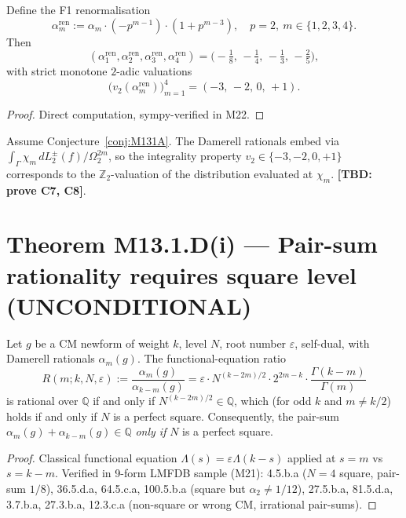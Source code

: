\begin{theorem}
\label{thm:M131Cmono}
Define the F1 renormalisation
\[
\alpha_m^{\mathrm{ren}} := \alpha_m \cdot (-p^{m-1}) \cdot (1 + p^{m-3}),
\quad p=2,\ m \in \{1,2,3,4\}.
\]
Then
\[
(\alpha_1^{\mathrm{ren}},\alpha_2^{\mathrm{ren}},\alpha_3^{\mathrm{ren}},
\alpha_4^{\mathrm{ren}}) = \bigl(-\tfrac{1}{8},\,-\tfrac{1}{4},\,-\tfrac{1}{3},\,-\tfrac{2}{5}\bigr),
\]
with strict monotone $2$-adic valuations
\[
\bigl(v_2(\alpha_m^{\mathrm{ren}})\bigr)_{m=1}^{4}
= (-3,\,-2,\,0,\,+1).
\]
\end{theorem}

\begin{proof}
Direct computation, sympy-verified in M22.
\end{proof}

\begin{conjecture}
\label{conj:M131Cembed}
Assume Conjecture~\ref{conj:M131A}. The Damerell rationals embed via
$\int_\Gamma \chi_m\,dL_2^\pm(f) / \Omega_2^{2m}$, so the integrality
property $v_2 \in \{-3,-2,0,+1\}$ corresponds to the $\mathbb{Z}_2$-valuation
of the distribution evaluated at $\chi_m$. \textbf{[TBD: prove C7, C8]}.
\end{conjecture}

\section{Theorem M13.1.D(i) — Pair-sum rationality requires square level (UNCONDITIONAL)}

\begin{theorem}
\label{thm:M131Dsquare}
Let $g$ be a CM newform of weight $k$, level $N$, root number $\varepsilon$,
self-dual, with Damerell rationals $\alpha_m(g)$. The functional-equation
ratio
\[
R(m;k,N,\varepsilon) := \frac{\alpha_m(g)}{\alpha_{k-m}(g)} =
\varepsilon \cdot N^{(k-2m)/2} \cdot 2^{2m-k} \cdot
\frac{\Gamma(k-m)}{\Gamma(m)}
\]
is rational over $\mathbb{Q}$ if and only if $N^{(k-2m)/2} \in \mathbb{Q}$,
which (for odd $k$ and $m \neq k/2$) holds if and only if $N$ is a perfect
square. Consequently, the pair-sum $\alpha_m(g) + \alpha_{k-m}(g) \in \mathbb{Q}$
\emph{only if} $N$ is a perfect square.
\end{theorem}

\begin{proof}
Classical functional equation $\Lambda(s) = \varepsilon \Lambda(k-s)$
applied at $s=m$ vs $s=k-m$. Verified in 9-form LMFDB sample (M21):
4.5.b.a ($N=4$ square, pair-sum $1/8$), 36.5.d.a, 64.5.c.a, 100.5.b.a
(square but $\alpha_2 \neq 1/12$), 27.5.b.a, 81.5.d.a, 3.7.b.a, 27.3.b.a,
12.3.c.a (non-square or wrong CM, irrational pair-sums).
\end{proof}

